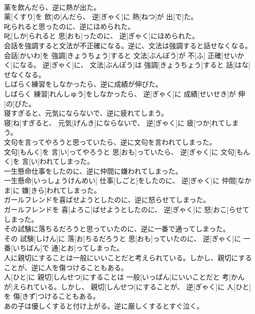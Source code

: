 \documentclass[8pt]{extreport}
\begin{document}
\begin{CJK}{UTF8}{min}
\\	薬を飲んだら、逆に熱が出た。	
\\	薬[くすり]を 飲[の]んだら、 逆[ぎゃく]に 熱[ねつ]が 出[で]た。
\\	叱られると思ったのに、逆にほめられた。	
\\	叱[しか]られると 思[おも]ったのに、 逆[ぎゃく]にほめられた。
\\	会話を強調すると文法が不正確になる。逆に、文法は強調すると話せなくなる。	
\\	会話[かいわ]を 強調[きょうちょう]すると 文法[ぶんぽう]が 不[ふ] 正確[せいかく]になる。 逆[ぎゃく]に、 文法[ぶんぽう]は 強調[きょうちょう]すると 話[はな]せなくなる。
\\	しばらく練習をしなかったら、逆に成績が伸びた。	
\\	しばらく 練習[れんしゅう]をしなかったら、 逆[ぎゃく]に 成績[せいせき]が 伸[の]びた。
\\	寝すぎると、元気にならないで、逆に疲れてしまう。	
\\	寝[ね]すぎると、 元気[げんき]にならないで、 逆[ぎゃく]に 疲[つか]れてしまう。
\\	文句を言ってやろうと思っていたら、逆に文句を言われてしまった。	
\\	文句[もんく]を 言[い]ってやろうと 思[おも]っていたら、 逆[ぎゃく]に 文句[もんく]を 言[い]われてしまった。
\\	一生懸命仕事をしたのに、逆に仲間に嫌われてしまった。	
\\	一生懸命[いっしょうけんめい] 仕事[しごと]をしたのに、 逆[ぎゃく]に 仲間[なかま]に 嫌[きら]われてしまった。
\\	ガールフレンドを喜ばせようとしたのに、逆に怒らせてしまった。	
\\	ガールフレンドを 喜[よろこ]ばせようとしたのに、 逆[ぎゃく]に 怒[おこ]らせてしまった。
\\	その試験に落ちるだろうと思っていたのに、逆に一番で通ってしまった。	
\\	その 試験[しけん]に 落[お]ちるだろうと 思[おも]っていたのに、 逆[ぎゃく]に 一番[いちばん]で 通[とお]ってしまった。
\\	人に親切にすることは一般にいいことだと考えられている。しかし、親切にすることが、逆に人を傷つけることもある。	
\\	人[ひと]に 親切[しんせつ]にすることは 一般[いっぱん]にいいことだと 考[かんが]えられている。しかし、 親切[しんせつ]にすることが、 逆[ぎゃく]に 人[ひと]を 傷[きず]つけることもある。
\\	あの子は優しくすると付け上がる。逆に厳しくするとすぐ泣く。	

\end{CJK}
\end{document}
